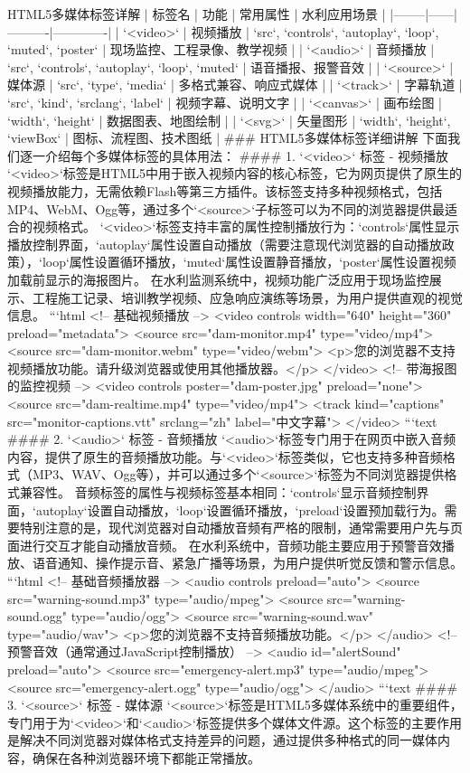 {{HTML5多媒体标签详解 | 标签名 | 功能 | 常用属性 | 水利应用场景 | |--------|------|----------|-------------| | `<video>` | 视频播放 | `src`, `controls`, `autoplay`, `loop`, `muted`, `poster` | 现场监控、工程录像、教学视频 | | `<audio>` | 音频播放 | `src`, `controls`, `autoplay`, `loop`, `muted` | 语音播报、报警音效 | | `<source>` | 媒体源 | `src`, `type`, `media` | 多格式兼容、响应式媒体 | | `<track>` | 字幕轨道 | `src`, `kind`, `srclang`, `label` | 视频字幕、说明文字 | | `<canvas>` | 画布绘图 | `width`, `height` | 数据图表、地图绘制 | | `<svg>` | 矢量图形 | `width`, `height`, `viewBox` | 图标、流程图、技术图纸 | ### HTML5多媒体标签详细讲解 下面我们逐一介绍每个多媒体标签的具体用法： #### 1. `<video>` 标签 - 视频播放 `<video>`标签是HTML5中用于嵌入视频内容的核心标签，它为网页提供了原生的视频播放能力，无需依赖Flash等第三方插件。该标签支持多种视频格式，包括MP4、WebM、Ogg等，通过多个`<source>`子标签可以为不同的浏览器提供最适合的视频格式。 `<video>`标签支持丰富的属性控制播放行为：`controls`属性显示播放控制界面，`autoplay`属性设置自动播放（需要注意现代浏览器的自动播放政策），`loop`属性设置循环播放，`muted`属性设置静音播放，`poster`属性设置视频加载前显示的海报图片。 在水利监测系统中，视频功能广泛应用于现场监控展示、工程施工记录、培训教学视频、应急响应演练等场景，为用户提供直观的视觉信息。 ```html <!-- 基础视频播放 --> <video controls width="640" height="360" preload="metadata"> <source src="dam-monitor.mp4" type="video/mp4"> <source src="dam-monitor.webm" type="video/webm"> <p>您的浏览器不支持视频播放功能。请升级浏览器或使用其他播放器。</p> </video> <!-- 带海报图的监控视频 --> <video controls poster="dam-poster.jpg" preload="none"> <source src="dam-realtime.mp4" type="video/mp4"> <track kind="captions" src="monitor-captions.vtt" srclang="zh" label="中文字幕"> </video> ```text #### 2. `<audio>` 标签 - 音频播放 `<audio>`标签专门用于在网页中嵌入音频内容，提供了原生的音频播放功能。与`<video>`标签类似，它也支持多种音频格式（MP3、WAV、Ogg等），并可以通过多个`<source>`标签为不同浏览器提供格式兼容性。 音频标签的属性与视频标签基本相同：`controls`显示音频控制界面，`autoplay`设置自动播放，`loop`设置循环播放，`preload`设置预加载行为。需要特别注意的是，现代浏览器对自动播放音频有严格的限制，通常需要用户先与页面进行交互才能自动播放音频。 在水利系统中，音频功能主要应用于预警音效播放、语音通知、操作提示音、紧急广播等场景，为用户提供听觉反馈和警示信息。 ```html <!-- 基础音频播放器 --> <audio controls preload="auto"> <source src="warning-sound.mp3" type="audio/mpeg"> <source src="warning-sound.ogg" type="audio/ogg"> <source src="warning-sound.wav" type="audio/wav"> <p>您的浏览器不支持音频播放功能。</p> </audio> <!-- 预警音效（通常通过JavaScript控制播放） --> <audio id="alertSound" preload="auto"> <source src="emergency-alert.mp3" type="audio/mpeg"> <source src="emergency-alert.ogg" type="audio/ogg"> </audio> ```text #### 3. `<source>` 标签 - 媒体源 `<source>`标签是HTML5多媒体系统中的重要组件，专门用于为`<video>`和`<audio>`标签提供多个媒体文件源。这个标签的主要作用是解决不同浏览器对媒体格式支持差异的问题，通过提供多种格式的同一媒体内容，确保在各种浏览器环境下都能正常播放。 }}
